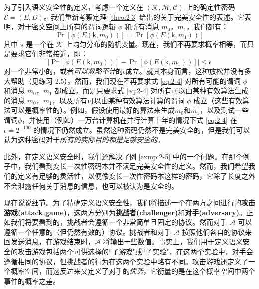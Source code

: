 为了引入语义安全性的定义，考虑一个定义在 $(\mathcal{K},\mathcal{M},\mathcal{C})$ 上的确定性密码 $\mathcal{E}=(E,D)$。我们重新考察定理 \ref{theo:2-3} 给出的关于完美安全性的表述。它表明，对于密文空间上所有的谓词逻辑 $\phi$ 和所有消息 $m_0$，$m_1$，我们都有：
\begin{equation}\label{eq:2-3}
\Pr[\phi(E(\mathsf{k},m_0))]=\Pr[\phi(E(\mathsf{k}, m_1))]
\end{equation}
其中 $\mathsf{k}$ 是一个在 $\mathcal{K}$ 上均匀分布的随机变量。现在，我们不再要求概率相等，而只是要求它们非常接近，即：
\begin{equation}\label{eq:2-4}
|\Pr[\phi(E(\mathsf{k},m_0))]-\Pr[\phi(E(\mathsf{k}, m_1))]|\leq \epsilon
\end{equation}
对一个非常小的，或者\emph{可以忽略不计}的$\epsilon$成立。就其本身而言，这种放松并没有多大帮助（见练习 2.5）。然而，我们现在不再要求式 \ref{eq:2-4} 对所有可能的谓词 $\phi$ 和消息 $m_0$，$m_1$ 都成立，而是只要求式 \ref{eq:2-4} 对所有可以由某种有效算法生成的消息 $m_0$，$m_1$，以及所有可以由某种有效算法计算的谓词 $\phi$ 成立（这些有效算法可以是概率性的）。例如，假设使用最好的算法来生成$m_0$和$m_1$，以及测试一些谓词$\phi$，并使用（例如）一万台计算机在并行计算十年的情况下式 \ref{eq:2-4} 在 $\epsilon = 2^{-100}$ 的情况下仍然成立。虽然这种密码仍然不是完美安全的，但是我们可以认为这种密码对于\emph{所有的实际目的都是足够安全的}。

此外，在定义语义安全时，我们还解决了例 \ref{exmp:2-5} 中的一个问题。在那个例子中，我们看到变长一次性密码本并不满足完美安全性的定义。然而，我们希望我们的定义有足够的灵活性，以便像变长一次性密码本这样的密码，它除了长度之外不会泄露任何关于消息的信息，也可以被认为是安全的。

现在说说细节。为了精确定义语义安全性，我们将描述一个在两方之间进行的\textbf{攻击游戏(attack game)}，这两方分别为\textbf{挑战者(challenger)}和\textbf{对手(adversary)}。正如我们将要看到的，挑战者会遵循一个非常简单且固定的协议。然而对手 $\mathcal{A}$ 可以遵循一个任意的（但仍然有效的）协议。挑战者和对手 $\mathcal{A}$ 按照他们各自的协议来回发送消息，在游戏结束时，$\mathcal{A}$ 将输出一些数值。事实上，我们用于定义语义安全的攻击游戏包括两个可供选择的``子游戏"或``子实验"，在这两个实验中，对手会遵循相同的协议，但挑战者的行为在这两个实验中略有不同。攻击游戏还定义了一个概率空间，而这反过来又定义了对手的\emph{优势}，它衡量的是在这个概率空间中两个事件的概率之差。

